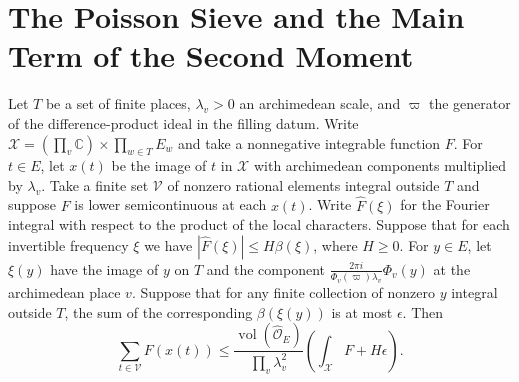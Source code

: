 \section{The Poisson Sieve and the Main Term of the Second Moment}
\label{sec:b-poisson}

\begin{lemma}
\label{lem:b-poisson-transfer}
\emitthmsource
Let $T$ be a set of finite places, $\lambda_v>0$ an archimedean scale, and $\varpi$ the generator of the difference-product ideal in the filling datum.
Write $\mathcal X=(\prod_v\mathbb C)\times\prod_{w\in T}E_w$ and take a nonnegative integrable function $F$.
For $t\in E$, let $x(t)$ be the image of $t$ in $\mathcal X$ with archimedean components multiplied by $\lambda_v$.
Take a finite set $\mathcal V$ of nonzero rational elements integral outside $T$ and suppose $F$ is lower semicontinuous at each $x(t)$.
Write $\widehat F(\xi)$ for the Fourier integral with respect to the product of the local characters. Suppose that for each invertible frequency $\xi$ we have
$|\widehat F(\xi)|\le H\beta(\xi)$, where $H\ge0$.
For $y\in E$, let $\xi(y)$ have the image of $y$ on $T$
and the component $\frac{2\pi i}{\Phi_v(\varpi)\lambda_v}\Phi_v(y)$ at the archimedean place $v$.
Suppose that for any finite collection of nonzero $y$ integral outside $T$, the sum of the corresponding $\beta(\xi(y))$ is at most $\epsilon$. Then
\[
 \sum_{t\in\mathcal V} F(x(t))
  \le \frac{\operatorname{vol}(\widehat{\mathcal O}_E)}
              {\prod_v\lambda_v^2}\left(\int_{\mathcal X}F+H\epsilon\right).
\]
\end{lemma}

